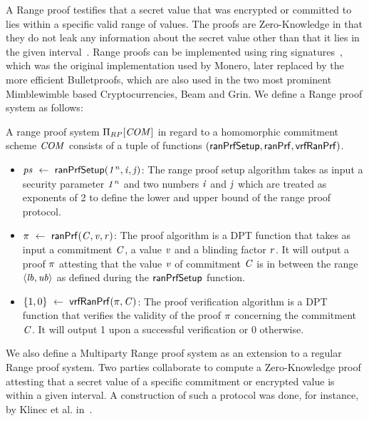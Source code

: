 A Range proof testifies that a secret value that was encrypted or committed to lies within a specific valid range of values.
The proofs are Zero-Knowledge in that they do not leak any information about the secret value other than that it lies in the given interval~\cite{bunz2018bulletproofs}.
Range proofs can be implemented using ring signatures~\cite{noether2016ring}, which was the original implementation used by Monero, later replaced by the more efficient Bulletproofs\cite{bunz2018bulletproofs}, which are also used in the two most prominent Mimblewimble based Cryptocurrencies, Beam and Grin.
We define a Range proof system as follows:

\begin{definition}\label{def:pre:rangeproof}
    A range proof system $\Pi_{RP}[\mathit{COM}]$ in regard to a homomorphic commitment scheme $\mathit{COM}$ consists of a tuple of functions $(\mathsf{ranPrfSetup}, \mathsf{ranPrf}, \mathsf{vrfRanPrf})$.
    \begin{itemize}
        \item $\mathit{ps} ~\leftarrow~ \mathsf{ranPrfSetup}(\mathit{1^n},\mathit{i},\mathit{j})$: The range proof setup algorithm takes as input a security parameter $\mathit{1^n}$ and two numbers $\mathit{i}$ and $\mathit{j}$ which are treated as exponents of 2 to define the lower and upper bound of the range proof protocol.
        \item $\pi ~\leftarrow~ \mathsf{ranPrf}(\mathit{C},\mathit{v},\mathit{r})$: The proof algorithm is a DPT function that takes as input a commitment $\mathit{C}$, a value $\mathit{v}$ and a blinding factor $\mathit{r}$.
        It will output a proof $\pi$ attesting that the value $\mathit{v}$ of commitment $\mathit{C}$ is in between the range $\langle \mathit{lb}, \mathit{ub} \rangle$ as defined during the $\mathsf{ranPrfSetup}$ function.
        \item $\{1,0\} ~\leftarrow~ \mathsf{vrfRanPrf}(\pi,\mathit{C})$: The proof verification algorithm is a DPT function that verifies the validity of the proof $\pi$ concerning the commitment $\mathit{C}$.
        It will output 1 upon a successful verification or 0 otherwise.
    \end{itemize}
\end{definition}

We also define a Multiparty Range proof system as an extension to a regular Range proof system. Two parties collaborate to compute a Zero-Knowledge proof attesting that a secret value of a specific commitment or encrypted value is within a given interval.
A construction of such a protocol was done, for instance, by Klinec et al. in~\cite{klinec2020privacy}.

